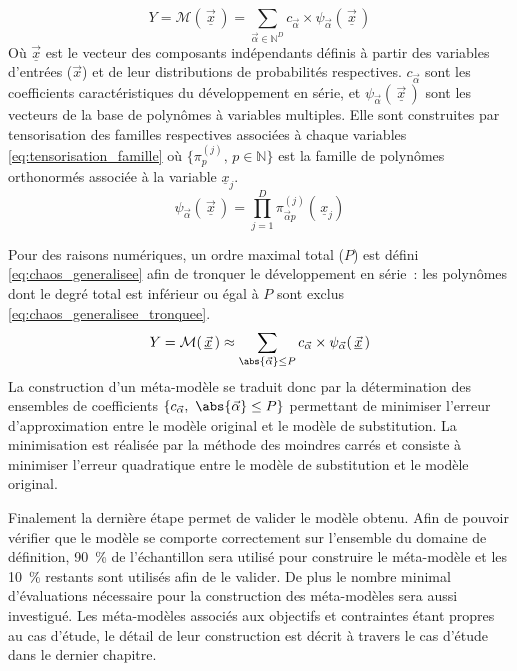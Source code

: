 \begin{equation}\label{eq:chaos_generalisee}
  Y = \mathcal{M}(\,\underline{\vec{x}}\,) = \sum_{\vec{\alpha} \in \mathbb{N}^{D}} c_{\vec{\alpha}} \times \psi_{\vec{\alpha}} (\,\underline{\vec{x}}\,)
\end{equation}
Où $\underline{\vec{x}}$ est le vecteur des composants indépendants définis à partir des
variables d’entrées ($\vec{x}$) et de leur distributions de probabilités respectives.
$c_{\vec{\alpha}}$ sont les coefficients caractéristiques du développement en série, et
$\psi_{\vec{\alpha}} (\,\underline{\vec{x}}\,)$ sont les vecteurs de la base de polynômes
à variables multiples. Elle sont construites par tensorisation des familles respectives
associées à chaque variables \eqref{eq:tensorisation_famille} où $\{\pi_{p}^{(j)},\, p \in \mathbb{N}\}$
est la famille de polynômes orthonormés associée à la variable $\underline{x}_{j}$.
\begin{equation}\label{eq:tensorisation_famille}
   \psi_{\vec{\alpha}}(\,\underline{\vec{x}}\,) = \prod_{j = 1}^{D}\pi_{\vec{\alpha}p}^{(j)} \left(\,\underline{x}_{j} \right)
\end{equation}

Pour des raisons numériques, un ordre maximal total ($P$) est défini
\eqref{eq:chaos_generalisee} afin de tronquer le développement en série~: les polynômes
dont le degré total est inférieur ou égal à $P$ sont exclus \eqref{eq:chaos_generalisee_tronquee}.
\begin{equation}\label{eq:chaos_generalisee_tronquee}
  Y = \mathcal{M}(\,\underline{\vec{x}}\,) \approx \sum_{\abs{\vec{\alpha}} \leq P} c_{\vec{\alpha}} \times \psi_{\vec{\alpha}}(\,\underline{\vec{x}}\,)
\end{equation}
La construction d’un méta-modèle se traduit donc par la détermination des ensembles de
coefficients $\{c_{\vec{\alpha}},\ \abs{\vec{\alpha}} \leq P\}$ permettant de minimiser
l’erreur d’approximation entre le modèle original et le modèle de substitution. La
minimisation est réalisée par la méthode des moindres carrés et consiste à minimiser
l’erreur quadratique entre le modèle de substitution et le modèle original.

Finalement la dernière étape permet de valider le modèle obtenu. Afin de pouvoir vérifier
que le modèle se comporte correctement sur l’ensemble du domaine de définition,
\SI{90}{\percent} de l’échantillon sera utilisé pour construire le méta-modèle et les
\SI{10}{\percent} restants sont utilisés afin de le valider. De plus le nombre minimal
d’évaluations nécessaire pour la construction des méta-modèles sera aussi investigué. Les
méta-modèles associés aux objectifs et contraintes étant propres au cas d’étude, le détail
de leur construction est décrit à travers le cas d’étude dans le dernier chapitre.


